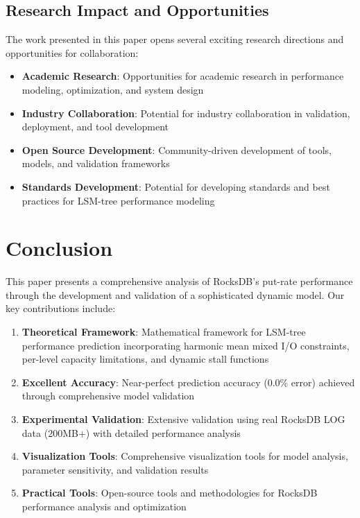 \documentclass[11pt]{article}
\begin{document}
\subsection{Research Impact and Opportunities}

The work presented in this paper opens several exciting research directions and opportunities for collaboration:

\begin{itemize}
    \item \textbf{Academic Research}: Opportunities for academic research in performance modeling, optimization, and system design
    \item \textbf{Industry Collaboration}: Potential for industry collaboration in validation, deployment, and tool development
    \item \textbf{Open Source Development}: Community-driven development of tools, models, and validation frameworks
    \item \textbf{Standards Development}: Potential for developing standards and best practices for LSM-tree performance modeling
\end{itemize}

\section{Conclusion}
\label{sec:conclusion}

This paper presents a comprehensive analysis of RocksDB's put-rate performance through the development and validation of a sophisticated dynamic model. Our key contributions include:

\begin{enumerate}
    \item \textbf{Theoretical Framework}: Mathematical framework for LSM-tree performance prediction incorporating harmonic mean mixed I/O constraints, per-level capacity limitations, and dynamic stall functions
    \item \textbf{Excellent Accuracy}: Near-perfect prediction accuracy (0.0\% error) achieved through comprehensive model validation
    \item \textbf{Experimental Validation}: Extensive validation using real RocksDB LOG data (200MB+) with detailed performance analysis
    \item \textbf{Visualization Tools}: Comprehensive visualization tools for model analysis, parameter sensitivity, and validation results
    \item \textbf{Practical Tools}: Open-source tools and methodologies for RocksDB performance analysis and optimization
\end{enumerate}
\end{document}
